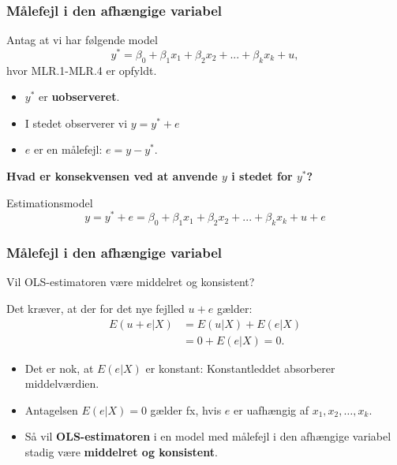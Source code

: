 \documentclass[aspectratio=43,t]{beamer}
\begin{document}

\begin{frame}
\frametitle{Målefejl i den afhængige variabel}
	
	Antag at vi har følgende model
	\begin{equation*}
	y^{*}=\beta _{0}+\beta _{1}x_{1}+\beta _{2}x_{2}+...+\beta _{k}x_{k}+u,
	\end{equation*}
	hvor MLR.1-MLR.4 er opfyldt.

	\begin{itemize}
	\item $y^{*}$ er \textbf{uobserveret}.
	
	\item I stedet observerer vi $y = y^{*}+e$

	\item $e$ er en målefejl: $e = y - y^{*}$.
	\end{itemize}
	
	\textbf{Hvad er konsekvensen ved at anvende $y$ i stedet for $y^{*}$?}
	
	Estimationsmodel
	\begin{equation*}
	y=y^{\ast }+e =\beta _{0}+\beta _{1}x_{1}+\beta _{2}x_{2}+...+\beta_{k}x_{k}+u+e
	\end{equation*}

\end{frame}


\begin{frame}
\frametitle{Målefejl i den afhængige variabel}
	
	Vil OLS-estimatoren være middelret og konsistent?

	Det kræver, at der for det nye fejlled $u+e$ gælder: 
	\begin{align*}
	E(u+e|X) &= E(u|X)+E(e|X) \\
			   &= 0+E(e|X)=0.
	\end{align*}
	\begin{itemize}
	\item Det er nok, at $E(e|X)$ er konstant: Konstantleddet absorberer middelværdien.

	\item Antagelsen $E(e|X)=0$ gælder fx, hvis $e$ er uafhængig af $x_{1},x_{2},\ldots,x_{k}$.

	\item Så vil \textbf{OLS-estimatoren} i en model med målefejl i
	den afhængige variabel stadig være \textbf{middelret og konsistent}.
\end{itemize}

\end{frame}
\end{document}
